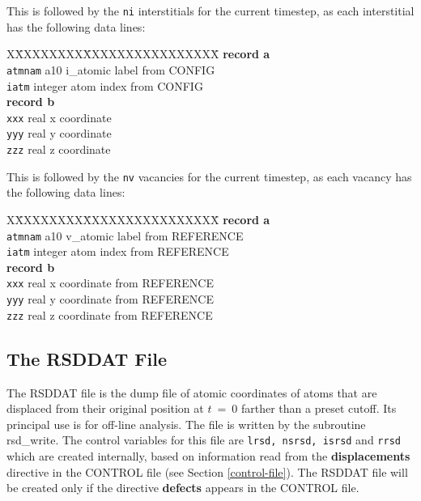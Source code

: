 This is followed by the {\tt ni} interstitials for the current
timestep, as each interstitial has the following data lines:
\begin{tabbing}
X\=XXXXXXXX\=XXXXXXXXXXXXXXXX\=\kill
{\bf record a}  \\
\> {\tt atmnam} \> a10     \> i\_atomic label from CONFIG \\
\> {\tt iatm}   \> integer \> atom index from CONFIG \\
{\bf record b} \\
\> {\tt xxx}    \> real    \> x coordinate \\
\> {\tt yyy}    \> real    \> y coordinate \\
\> {\tt zzz}    \> real    \> z coordinate \\
\end{tabbing}
This is followed by the {\tt nv} vacancies for the current
timestep, as each vacancy has the following data lines:
\begin{tabbing}
X\=XXXXXXXX\=XXXXXXXXXXXXXXXX\=\kill
{\bf record a}  \\
\> {\tt atmnam} \> a10     \> v\_atomic label from REFERENCE \\
\> {\tt iatm}   \> integer \> atom index from REFERENCE \\
{\bf record b} \\
\> {\tt xxx}    \> real    \> x coordinate from REFERENCE \\
\> {\tt yyy}    \> real    \> y coordinate from REFERENCE \\
\> {\tt zzz}    \> real    \> z coordinate from REFERENCE \\
\end{tabbing}

\subsection{The RSDDAT File}
\label{rsddat-file}

The RSDDAT file is the dump file of atomic coordinates of atoms
that are displaced from their original position at $t~=~0$ farther
than a preset cutoff.  Its principal use is for off-line analysis.
The file is written by the subroutine {\sc rsd\_write}.  The control
variables for this file are {\tt lrsd, nsrsd, isrsd} and {\tt rrsd}
which are created internally, based on information read from
the {\bf displacements} directive in the CONTROL file (see Section
\ref{control-file}).  The RSDDAT file will be created only if the
directive {\bf defects} appears in the CONTROL file.

